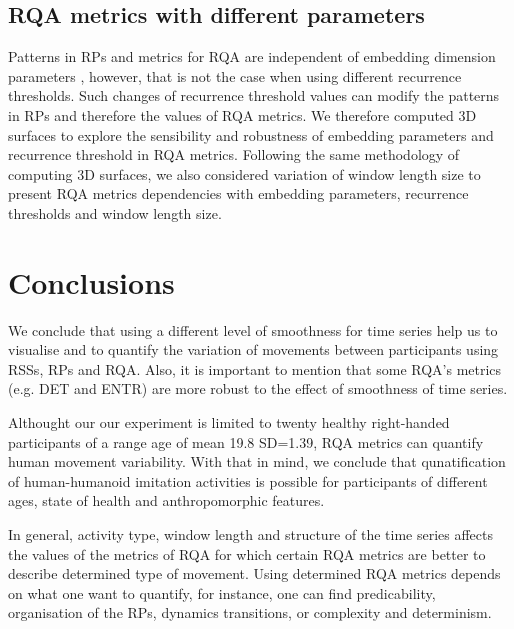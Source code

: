 \subsection{RQA metrics with different parameters}
Patterns in RPs and metrics for RQA are independent of embedding dimension parameters \cite{iwanski1998},
however, that is not the case when using different recurrence thresholds. Such changes of 
recurrence threshold values can modify the patterns in RPs and therefore the values of RQA metrics. 
We therefore computed 3D surfaces to explore the sensibility and robustness of 
embedding parameters and recurrence threshold in RQA  metrics. 
Following the same methodology of computing 3D surfaces, we also considered variation 
of window length size to present RQA metrics dependencies with embedding parameters, 
recurrence thresholds and window length size.





\section{Conclusions}
We conclude that using a different level of smoothness for time series help us 
to visualise and to quantify the variation of movements between participants 
using RSSs, RPs and RQA. Also, it is important to mention that some RQA's metrics 
(e.g. DET and  ENTR) are more robust to the effect of smoothness of time series.

Althought our our experiment is limited to twenty healthy right-handed participants 
of a range age of mean 19.8 SD=1.39, RQA metrics can quantify human movement 
variability. With that in mind, we conclude that qunatification of human-humanoid
imitation activities is possible for participants of different ages, state of health 
and anthropomorphic features.


%
%

In general, activity type, window length and structure of the time series 
affects the values of the metrics of RQA for which certain RQA metrics 
are better to describe determined type of movement.
Using determined RQA metrics depends on what one want to quantify, for instance, 
one can find predicability, organisation of the RPs, dynamics transitions, 
or complexity and determinism.


